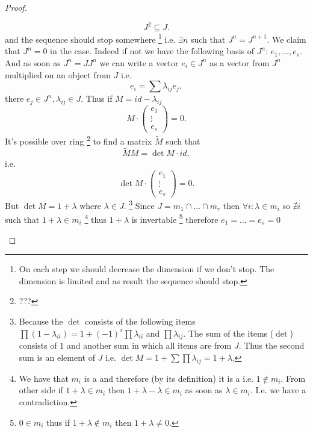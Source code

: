 \begin{theorem}
\begin{proof}
\begin{enumerate}
\[      J^2 \subseteq J.
      \]
      and the sequence should stop somewhere
      \footnote {
        On each step we should decrease the dimension if we don't
        stop. The dimension is limited and as result the sequence
        should stop.
      }
      i.e.
      $\exists n$ such that $J^n = J^{n+1}$. We claim that $J^n = 0$
      in the case. Indeed if not we have the following basis of $J^n$:
      $e_1, \dots, e_s$. And as soon as $J^n = J J^n$ we can write a
      vector $e_i \in J^n$ as a vector from $J^n$ multiplied on an
      object from $J$ i.e.
      \[
      e_i = \sum \lambda_{ij} e_j,
      \]
      there $e_j \in J^n, \lambda_{ij} \in J$. Thus if
      $M = id - \lambda_{ij}$
      \[
      M \cdot \left(
      \begin{array}{c}
        e_1 \\
        \vdots \\
        e_s
      \end{array}
      \right) = 0.
      \]
      It's possible over ring
      \footnote{
        ???
      }
      to find a matrix $\tilde{M}$ such that
      \[
      \tilde{M} M = \det M \cdot id,
      \]
      i.e.
      \[
      \det M \cdot \left(
      \begin{array}{c}
        e_1 \\
        \vdots \\
        e_s
      \end{array}
      \right) = 0.
      \]
      But $\det M = 1 + \lambda$ where $\lambda \in J$.
      \footnote{
        Because the $\det$ consists of the following 
        items $\prod (1-\lambda_{ii}) = 1 + (-1)^s\prod \lambda_{ii}$
        and $\prod \lambda_{ij}$. The sum of the items ($\det$)
        consists of $1$ and another sum in which all items are from
        $J$. Thus the second sum is an element of $J$ i.e.
        $\det M = 1 + \sum \prod \lambda_{ij} = 1 + \lambda$.
      }
      Since  $J = m_1 \cap \dots \cap m_r$ then
      $\forall i: \lambda \in m_i$
      so $\nexists i$ such that $1 + \lambda \in m_i$
      \footnote{
        We have that $m_i$ is a  and therefore (by
        its definition) it is a  i.e.
        $1 \notin m_i$. From other side if $1 + \lambda \in m_i$ then
        $1 + \lambda - \lambda \in m_i$ as soon as $\lambda \in
        m_i$. I.e. we have a contradiction.  
      }
      thus $1 + \lambda$ is invertable
      \footnote {
        $0 \in m_i$ thus if $1 + \lambda \notin m_i$ then
        $1 + \lambda \ne 0$.
      }
      therefore $e_1 = \dots = e_s = 0$

\end{enumerate}
\end{proof}
\end{theorem}
